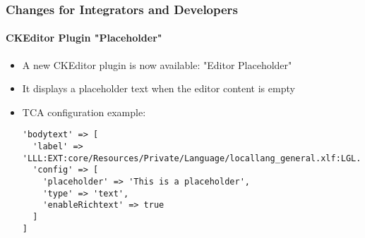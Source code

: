 %

\begin{frame}[fragile]
	\frametitle{Changes for Integrators and Developers}
	\framesubtitle{CKEditor Plugin "Placeholder"}


	\begin{itemize}
		\item A new CKEditor plugin is now available: "Editor Placeholder"
		\item It displays a placeholder text when the editor content is empty
		\item TCA configuration example:
\begin{lstlisting}
'bodytext' => [
  'label' => 'LLL:EXT:core/Resources/Private/Language/locallang_general.xlf:LGL.text',
  'config' => [
    'placeholder' => 'This is a placeholder',
    'type' => 'text',
    'enableRichtext' => true
  ]
]
\end{lstlisting}

	\end{itemize}

\end{frame}


